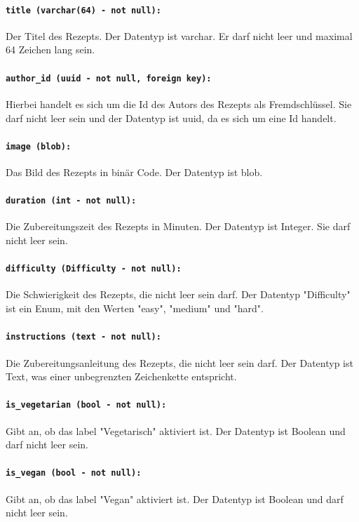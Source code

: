 \documentclass{entwurfsheft}
\begin{document}
\paragraph{\texttt{title (varchar(64) - not null):}} Der Titel des Rezepts. Der Datentyp ist \Gls{varchar}. Er darf nicht leer und maximal 64 Zeichen lang sein.
\paragraph{\texttt{author\_id (uuid - not null, foreign key):}} Hierbei handelt es sich um die Id des Autors des Rezepts als Fremdschlüssel. Sie darf nicht leer sein und der Datentyp ist \Gls{uuid}, da es sich um eine Id handelt.
\paragraph{\texttt{image (blob):}} Das Bild des Rezepts in binär Code. Der Datentyp ist \Gls{blob}.
\paragraph{\texttt{duration (int - not null):}} Die Zubereitungszeit des Rezepts in Minuten. Der Datentyp ist Integer. Sie darf nicht leer sein.
\paragraph{\texttt{difficulty (Difficulty - not null):}} Die Schwierigkeit des Rezepts, die nicht leer sein darf. Der Datentyp "Difficulty" ist ein Enum, mit den Werten "easy", "medium" und "hard".
\paragraph{\texttt{instructions (text - not null):}} Die Zubereitungsanleitung des Rezepts, die nicht leer sein darf. Der Datentyp ist Text, was einer unbegrenzten Zeichenkette entspricht.
\paragraph{\texttt{is\_vegetarian (bool - not null):}} Gibt an, ob das \Gls{label} "Vegetarisch" aktiviert ist. Der Datentyp ist Boolean und darf nicht leer sein.
\paragraph{\texttt{is\_vegan (bool - not null):}} Gibt an, ob das \Gls{label} "Vegan" aktiviert ist. Der Datentyp ist Boolean und darf nicht leer sein.
\end{document}
